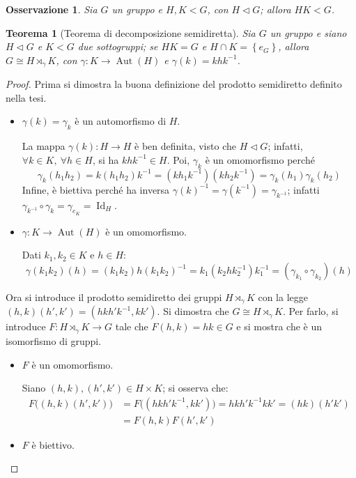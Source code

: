 \documentclass[12pt]{scrartcl}
\theoremstyle{style}
\newtheorem{teorema}{Teorema}[section]
\newtheorem{osservazione}{Osservazione}[section]
\numberwithin{equation}{subsection}
\begin{document}
\begin{osservazione}
	Sia $G$ un gruppo e $H,K < G$, con $H \lhd G$; allora $HK < G$.
\end{osservazione}
\begin{teorema}
	[Teorema di decomposizione semidiretta]\label{scth}
	Sia $G$ un gruppo e siano $H \lhd G$ e $K < G$ due sottogruppi; se $HK = G$ e $H \cap K = \left\{ e_G \right\} $, allora $G \cong H \rtimes _\gamma K$, con $\gamma: K \to \operatorname{Aut} (H)$ e $\gamma(k) = k hk^{-1}$.
\end{teorema}
	\begin{proof}
		Prima si dimostra la buona definizione del prodotto semidiretto definito nella tesi.
		\begin{itemize}
			\item $\gamma(k)=\gamma_k$ \`e un automorfismo di $H$.

				La mappa $\gamma(k):H\to H$ \`e ben definita, visto che $H\lhd G$; infatti, $\forall k \in  K, \ \forall h \in H$, si ha $k h k^{-1}\in H$.
				Poi, $\gamma_k$ \`e un omomorfismo perch\'e
				\[
				\gamma_k (h_1h_2) = k (h_1h_2) k^{-1} = (kh_1k^{-1})(k h_2k^{-1}) = \gamma_k(h_1) \gamma_k(h_2)
				\] 
				Infine, \`e biettiva perch\'e ha inversa $\gamma(k)^{-1} =\gamma(k^{-1})= \gamma_{k^{-1}} $; infatti $\gamma_{k^{-1}} \circ \gamma_k = \gamma_{e_K}  = \operatorname{Id} _H$.
			\item $\gamma : K \to \operatorname{Aut} (H)$ \`e un omomorfismo.

				Dati $k_1,k_2 \in K$ e $h \in H$:
\[
\gamma(k_1k_2)(h) = (k_1k_2)h(k_1k_2)^{-1} = k_1(k_2hk_2^{-1})k_1^{-1}= (\gamma_{k_1} \circ \gamma_{k_2} )(h)
\] 
		\end{itemize}
		Ora si introduce il prodotto semidiretto dei gruppi $H \rtimes _\gamma K$ con la legge $(h,k)(h',k') = (hkh'k^{-1},k k')$.
		Si dimostra che $G \cong H \rtimes _\gamma K$.
		Per farlo, si introduce $F : H \rtimes _\gamma K \to G$ tale che $F(h,k) = hk \in G$ e si mostra che \`e un isomorfismo di gruppi.
		\begin{itemize}
			\item $F$ \`e un omomorfismo.

				Siano $(h,k), (h',k') \in H \times K$; si osserva che:
				\[
					\begin{split}
						F\big((h,k)(h',k')\big) &= F\big((hkh'k^{-1},k k')\big) = hkh'k^{-1} k k'= (hk)(h'k')\\
									&= F(h,k) F(h',k')
					\end{split}
				\] 
			\item $F$ \`e biettivo.


\end{itemize}
\end{proof}
\end{document}
